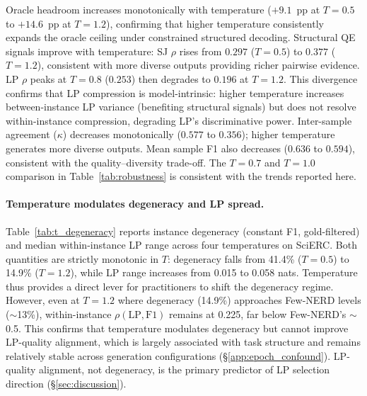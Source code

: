Oracle headroom increases monotonically with temperature ($+9.1$~pp at $T{=}0.5$ to $+14.6$~pp at $T{=}1.2$), confirming that higher temperature consistently expands the oracle ceiling under constrained structured decoding.
Structural QE signals improve with temperature: SJ $\rho$ rises from $0.297$ ($T{=}0.5$) to $0.377$ ($T{=}1.2$), consistent with more diverse outputs providing richer pairwise evidence.
LP $\rho$ peaks at $T{=}0.8$ ($0.253$) then degrades to $0.196$ at $T{=}1.2$.
This divergence confirms that LP compression is model-intrinsic: higher temperature increases between-instance LP variance (benefiting structural signals) but does not resolve within-instance compression, degrading LP's discriminative power.
Inter-sample agreement ($\kappa$) decreases monotonically ($0.577$ to $0.356$); higher temperature generates more diverse outputs. Mean sample F1 also decreases ($0.636$ to $0.594$), consistent with the quality--diversity trade-off.
The $T{=}0.7$ and $T{=}1.0$ comparison in Table~\ref{tab:robustness} is consistent with the trends reported here.

\paragraph{Temperature modulates degeneracy and LP spread.}
Table~\ref{tab:t_degeneracy} reports instance degeneracy (constant F1, gold-filtered) and median within-instance LP range across four temperatures on SciERC.
Both quantities are strictly monotonic in $T$: degeneracy falls from 41.4\% ($T{=}0.5$) to 14.9\% ($T{=}1.2$), while LP range increases from 0.015 to 0.058 nats.
Temperature thus provides a direct lever for practitioners to shift the degeneracy regime.
However, even at $T{=}1.2$ where degeneracy (14.9\%) approaches Few-NERD levels (${\sim}$13\%), within-instance $\rho(\text{LP}, \text{F1})$ remains at 0.225, far below Few-NERD's ${\sim}$0.5.
This confirms that temperature modulates degeneracy but cannot improve LP-quality alignment, which is largely associated with task structure and remains relatively stable across generation configurations (\S\ref{app:epoch_confound}). LP-quality alignment, not degeneracy, is the primary predictor of LP selection direction (\S\ref{sec:discussion}).

\begin{table}[h]
\centering
\small
\caption{Temperature sensitivity of degeneracy and LP spread (SciERC NER, Qwen3-8B, $N{=}8$). Degeneracy: constant-F1, gold-filtered. LP range: median within-instance range.}
\label{tab:t_degeneracy}
\end{table}

